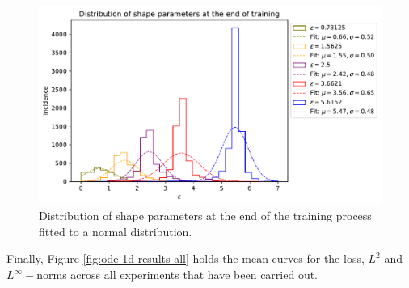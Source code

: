 \documentclass[12pt]{report} %
\begin{document}
\begin{figure}[h]
  \includegraphics[width=\textwidth]{imagenes/experiments/1d/ode/distribution_of_shape_parameters_at_end_of_training.pdf}
  \caption{Distribution of shape parameters at the end of the training process fitted to a normal distribution.}
  \label{fig:ode-1d-results-shape-parameters}
\end{figure}

Finally,
Figure \ref{fig:ode-1d-results-all} holds the mean curves for the loss, $L^2$ and $L^\infty-$norms across all experiments that have been carried out.
\end{document}
